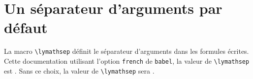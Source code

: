 \documentclass[12pt,a4paper]{article}
\begin{document}
\section{Un séparateur d'arguments par défaut}

La macro \verb+\lymathsep+ définit le séparateur d'arguments dans les formules écrites. Cette documentation utilisant l'option \verb+french+ de \verb+babel+, la valeur de \verb+\lymathsep+ est \fbox{\,\lymathsep$\vphantom{F}$\,} . Sans ce choix, la valeur de \verb+\lymathsep+ sera \fbox{\,,$\vphantom{F}$\,} .
\end{document}
